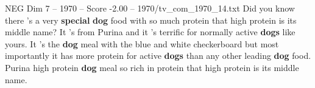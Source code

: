 \begin{textsample}{NEG Dim 7 – 1970 – Score -2.00 – 1970/tv\_com\_1970\_14.txt}  \label{ex:f7_neg_058}
Did you know there 's a very \textbf{special} \textbf{dog} food with so much protein that high protein is its middle name?
It 's from Purina and it 's terrific for normally active \textbf{dogs} like yours.
It 's the \textbf{dog} meal with the blue and white checkerboard but most importantly it has more protein for active \textbf{dogs} than any other leading \textbf{dog} food.
Purina high protein \textbf{dog} meal so rich in protein that high protein is its middle name.

\end{textsample}
